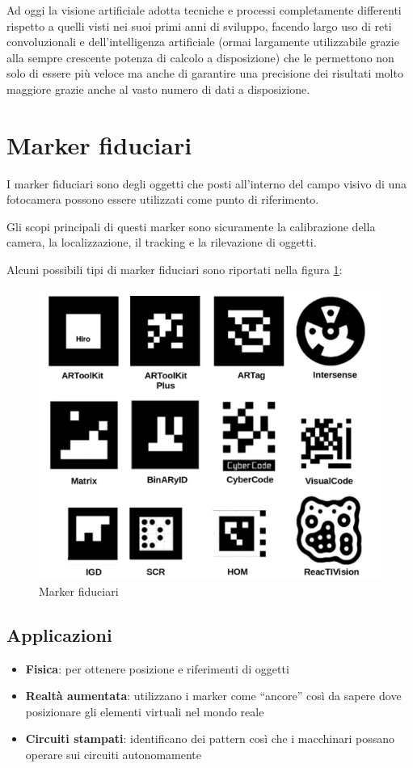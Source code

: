 \documentclass[12pt,a4paper,openright,twoside]{book}
\begin{document}
Ad oggi la visione artificiale adotta tecniche e processi completamente differenti rispetto a quelli visti nei suoi primi anni di sviluppo, facendo largo uso di reti convoluzionali e dell'intelligenza artificiale (ormai largamente utilizzabile grazie alla sempre crescente potenza di calcolo a disposizione) che le permettono non solo di essere più veloce ma anche di garantire una precisione dei risultati molto maggiore grazie anche al vasto numero di dati a disposizione.

\section{Marker fiduciari}
I marker fiduciari sono degli oggetti che posti all'interno del campo visivo di una fotocamera possono essere utilizzati come punto di riferimento. 

Gli scopi principali di questi marker sono sicuramente la calibrazione della camera, la localizzazione, il tracking e la rilevazione di oggetti.

Alcuni possibili tipi di marker fiduciari sono riportati nella figura \ref{fig:marker_fiduciari}:

\begin{figure}
	\centering
	\includegraphics[width=0.8\linewidth]{./figures/fiducialMarkers.png}
	\caption{Marker fiduciari\cite{GARRIDOJURADO20142280}}
	\label{fig:marker_fiduciari}
\end{figure}

\subsection{Applicazioni}
\begin{itemize}
	\item \textbf{Fisica}: per ottenere posizione e riferimenti di oggetti
	\item \textbf{Realtà aumentata}: utilizzano i marker come ``ancore'' così da sapere dove posizionare gli elementi virtuali nel mondo reale
	\item \textbf{Circuiti stampati}: identificano dei pattern così che i macchinari possano operare sui circuiti autonomamente
\end{itemize}
\end{document}
